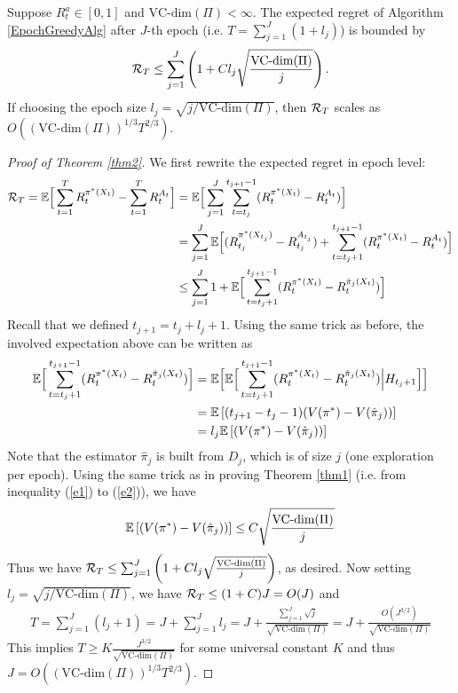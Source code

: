 \documentclass[11pt]{article}
\begin{document}
\begin{theorem}
	\label{thm2}
	Suppose $R_t^a \in [0, 1]$ and $\text{VC-dim}(\Pi) < \infty$. The expected regret of Algorithm \ref{EpochGreedyAlg} after $J$-th epoch (i.e. $T = \sum_{j=1}^{J} (1+l_j)$) is bounded by
	$$\mathcal{R}_T \leq  \sum_{j=1}^{J} \left(1  +   C l_j \sqrt{\frac{\text{VC-dim}(\Pi)}{j}}\right).$$ 
	If choosing the epoch size $l_j =\sqrt{j/\text{VC-dim}(\Pi)}$, then $\mathcal{R}_T$ scales as $O((\text{VC-dim}(\Pi))^{1/3}T^{2/3})$. 
	
\end{theorem}
\vspace{2ex}
\begin{proof}[Proof of Theorem \ref{thm2}]
	We first rewrite the expected regret in epoch level:
	\begin{align*}
	\mathcal{R}_T   = \mathbb{E}\Big[ \sum_{t=1}^{T} R_{t}^{\pi^*(X_t)} - \sum_{t=1}^{T} R_t^{A_t}  \Big]
	& =\mathbb{E}\Big[ \sum_{j=1}^{J} \sum_{t=t_j}^{t_{j+1}-1}(R_{t}^{\pi^*(X_t)} - R_t^{A_t})  \Big]\\
	& =  \sum_{j=1}^{J} \mathbb{E}\Big[ (R_{t_j}^{\pi^*(X_{t_j})} - R_{t_j}^{A_{t_j}}) +  \sum_{t=t_j+1}^{t_{j+1}-1}(R_{t}^{\pi^*(X_t)} - R_t^{A_t})\Big]\\
	& \leq  \sum_{j=1}^{J} 1  + \mathbb{E}\Big[\sum_{t=t_j+1}^{t_{j+1}-1}(R_{t}^{\pi^*(X_t)} - R_t^{\hat \pi_j(X_t)})\Big]
	\end{align*}
	Recall that we defined $t_{j+1} = t_{j}+ l_j + 1$. Using the same trick as before, the involved expectation above can be written as
	\begin{align*}
		\mathbb{E}\Big[\sum_{t=t_j+1}^{t_{j+1}-1}(R_{t}^{\pi^*(X_t)} - R_t^{\hat \pi_j(X_t)})\Big] & =   \mathbb{E} \Big[  \mathbb{E} \Big[ \sum_{t=t_j+1}^{t_{j+1}-1}(R_{t}^{\pi^*(X_t)} - R_t^{\hat \pi_j(X_t)}) \Big| H_{t_j+1} \Big]  \Big]\\
		& =  \mathbb{E}\left[   (t_{j+1} - t_j -1) (V(\pi^*) - V(\hat \pi_j)) \right]\\
		& =  l_j \mathbb{E}\left[    (V(\pi^*) - V(\hat \pi_j)) \right]
	\end{align*}
	Note that the estimator $\hat \pi_j$ is built from $D_j$, which is of size $j$ (one exploration per epoch).  Using the same trick as in proving Theorem \ref{thm1} (i.e. from inequality (\ref{e1}) to (\ref{e2})), we have
	\begin{align*}
	\mathbb{E}\left[    (V(\pi^*) - V(\hat \pi_j)) \right] \leq  C \sqrt{\frac{\text{VC-dim}(\Pi)}{j}}
	\end{align*}
	Thus we have $\mathcal{R}_T \leq  \sum_{j=1}^{J} \left(1  +   C l_j \sqrt{\frac{\text{VC-dim}(\Pi)}{j}}\right)$, as desired. Now setting $l_j =\sqrt{j/\text{VC-dim}(\Pi)}$,  we have $\mathcal{R}_T \leq (1+C) J = O(J)$ and 
	\begin{align*}
	T = \sum_{j=1}^{J} (l_j +1) = J + \sum_{j=1}^{J} l_j = J + \frac{\sum_{j=1}^J \sqrt{j}}{ \sqrt{\text{VC-dim}(\Pi)}} =  J + \frac{O(J^{3/2})}{ \sqrt{\text{VC-dim}(\Pi)}}
	\end{align*}
	This implies $T \geq K  \frac{J^{3/2}}{\sqrt{\text{VC-dim}(\Pi)}} $ for some universal constant $K$ and thus $J = O((\text{VC-dim}(\Pi))^{1/3}T^{2/3})$.  
\end{proof}



\end{document}
